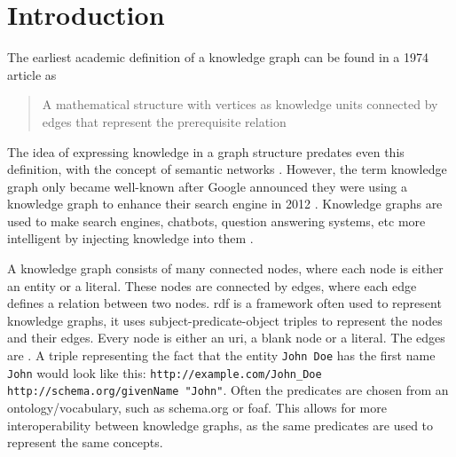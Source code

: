 
\chapter{Introduction}
\label{chapter:introduction}

The earliest academic definition of a knowledge graph can be found in a 1974 article as \begin{quote}
    A mathematical structure with vertices as knowledge units connected by edges that represent the prerequisite relation \citep{Marchi1974,bergman2019common}
\end{quote} 

The idea of expressing knowledge in a graph structure predates even this definition, with the concept of semantic networks \citep{Richens1956PreprogrammingFM}. %
However, the term knowledge graph only became well-known after Google announced they were using a knowledge graph to enhance their search engine in 2012 \citep{singhal2012introducing}. 
Knowledge graphs are used to make search engines, chatbots, question answering systems, etc more intelligent by injecting knowledge into them \citep{SurveyOnKGs}. 

A knowledge graph consists of many connected nodes, where each node is either an entity or a literal. These nodes are connected by edges, where each edge defines a relation between two nodes. \acrshort{rdf} is a framework often used to represent knowledge graphs, it uses subject-predicate-object triples to represent the nodes and their edges. Every node is either an \acrshort{uri}, a blank node or a literal. The edges are . A triple representing the fact that the entity \texttt{John Doe} has the first name \texttt{John} would look like this: \texttt{http://example.com/John\_Doe http://schema.org/givenName "John"}. Often the predicates are chosen from an ontology/vocabulary, such as schema.org or \acrshort{foaf}. This allows for more interoperability between knowledge graphs, as the same predicates are used to represent the same concepts.


